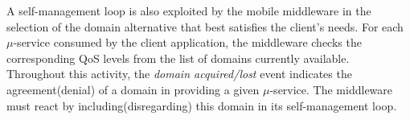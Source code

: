 





A self-management loop is also exploited by the mobile middleware in the selection of the domain alternative that best satisfies the client's needs. For each $\mu$-service consumed by the client application, the middleware checks the corresponding QoS levels from the list of domains currently available. %
Throughout this activity, the \textit{domain acquired/lost} event indicates the agreement(denial) of a domain in providing a given $\mu$-service. The middleware must react by including(disregarding) this domain in its self-management loop. %

